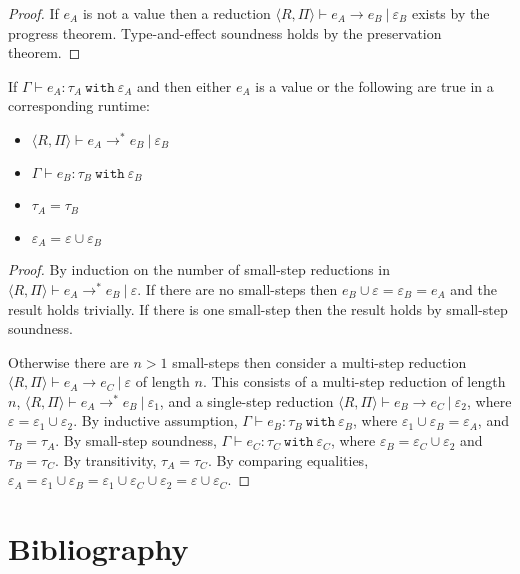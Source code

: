 \documentclass[a4paper,UKenglish]{lipics-v2016}
\newcommand{\kw}[1]{\mathtt{ #1 }~}
\newcommand{\multistep}[0]{ \longrightarrow^{*}}
\newcommand{\rctx}[0]{ \langle R, \Pi \rangle }
\begin{document}
\begin{proof}
If $e_A$ is not a value then a reduction $\rctx \vdash e_A \longrightarrow e_B~|~\varepsilon_B$ exists by the progress theorem. Type-and-effect soundness holds by the preservation theorem.
\end{proof}

\begin{theorem}
If $\Gamma \vdash e_A: \tau_A~\kw{with} \varepsilon_A$ and then either $e_A$ is a value or the following are true in a corresponding runtime:
\begin{itemize}
	\item $\rctx \vdash e_A \longrightarrow^{*} e_B~|~\varepsilon_B$
	\item $\Gamma \vdash e_B: \tau_B~\kw{with} \varepsilon_B$
	\item $\tau_A = \tau_B$
	\item $\varepsilon_A = \varepsilon \cup \varepsilon_B$
\end{itemize}
\end{theorem}

\begin{proof}
By induction on the number of small-step reductions in $\rctx \vdash e_A \multistep e_B~|~\varepsilon$. If there are no small-steps then $e_B \cup \varepsilon = \varepsilon_B = e_A$ and the result holds trivially. If there is one small-step then the result holds by small-step soundness.

Otherwise there are $n > 1$ small-steps then consider a multi-step reduction $\rctx \vdash e_A \longrightarrow e_C~|~\varepsilon$ of length $n$. This consists of a multi-step reduction of length $n$, $\rctx \vdash e_A \multistep e_B~|~\varepsilon_1$, and a single-step reduction $\rctx \vdash e_B \longrightarrow e_C~|~\varepsilon_2$, where $\varepsilon = \varepsilon_1 \cup \varepsilon_2$. By inductive assumption, $\Gamma \vdash e_B: \tau_B~\kw{with} \varepsilon_B$, where $\varepsilon_1 \cup \varepsilon_B = \varepsilon_A$, and $\tau_B = \tau_A$. By small-step soundness, $\Gamma \vdash e_C: \tau_C~\kw{with} \varepsilon_C$, where $\varepsilon_B = \varepsilon_C \cup \varepsilon_2$ and $\tau_B = \tau_C$. By transitivity, $\tau_A = \tau_C$. By comparing equalities, $\varepsilon_A = \varepsilon_1 \cup \varepsilon_B = \varepsilon_1 \cup \varepsilon_C \cup \varepsilon_2 = \varepsilon \cup \varepsilon_C$.

\end{proof}



\section{Bibliography}




\end{document}
